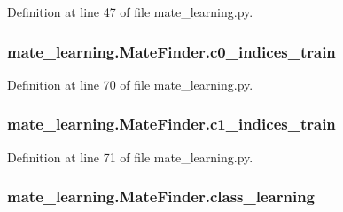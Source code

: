 Definition at line 47 of file mate\+\_\+learning.\+py.

\hypertarget{classmate__learning_1_1_mate_finder_a6f92751c17d9794258343fd7c5d5a4d5}{
\subsubsection[{c0\+\_\+indices\+\_\+train}]{\setlength{\rightskip}{0pt plus 5cm}mate\+\_\+learning.\+Mate\+Finder.\+c0\+\_\+indices\+\_\+train}}\label{classmate__learning_1_1_mate_finder_a6f92751c17d9794258343fd7c5d5a4d5}


Definition at line 70 of file mate\+\_\+learning.\+py.

\hypertarget{classmate__learning_1_1_mate_finder_a247fd9ebecfbbcd44c638803cdaf2bce}{
\subsubsection[{c1\+\_\+indices\+\_\+train}]{\setlength{\rightskip}{0pt plus 5cm}mate\+\_\+learning.\+Mate\+Finder.\+c1\+\_\+indices\+\_\+train}}\label{classmate__learning_1_1_mate_finder_a247fd9ebecfbbcd44c638803cdaf2bce}


Definition at line 71 of file mate\+\_\+learning.\+py.

\hypertarget{classmate__learning_1_1_mate_finder_a1d13f05feb21a3e48bf8822bf9c9fa67}{
\subsubsection[{class\+\_\+learning}]{\setlength{\rightskip}{0pt plus 5cm}mate\+\_\+learning.\+Mate\+Finder.\+class\+\_\+learning}}\label{classmate__learning_1_1_mate_finder_a1d13f05feb21a3e48bf8822bf9c9fa67}


